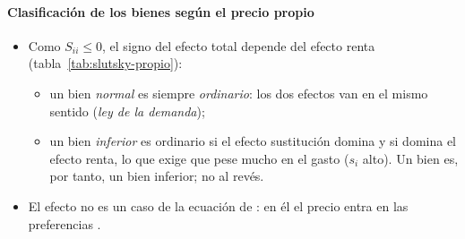 \documentclass[11pt]{article}
\begin{document}
\paragraph{Clasificación de los bienes según el precio propio}

\begin{itemize}
\item Como $S_{ii}\leq 0$, el signo del efecto total depende del efecto renta (tabla~\ref{tab:slutsky-propio}):
  \begin{itemize}
  \item un bien \emph{normal} es siempre \emph{ordinario}: los dos efectos van en el mismo sentido (\emph{ley de la demanda});
  \item un bien \emph{inferior} es ordinario si el efecto sustitución domina y  si domina el efecto renta, lo que exige que pese mucho en el gasto ($s_i$ alto). Un bien  es, por tanto, un bien inferior; no al revés.
  \end{itemize}
\item El efecto  no es un caso de la ecuación de : en él el precio entra en las preferencias\nocite{Veblen1899Leisure} .
\end{itemize}
\end{document}
